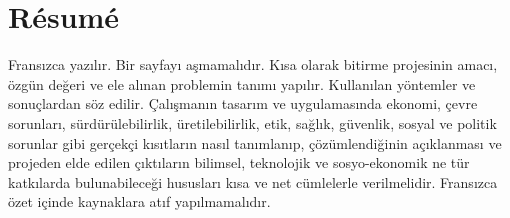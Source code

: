 \chapter{Résumé}

Fransızca yazılır. Bir sayfayı aşmamalıdır. Kısa olarak bitirme projesinin amacı, özgün değeri ve ele alınan problemin tanımı yapılır. Kullanılan yöntemler ve sonuçlardan söz edilir. Çalışmanın tasarım ve uygulamasında ekonomi, çevre sorunları, sürdürülebilirlik, üretilebilirlik, etik, sağlık, güvenlik, sosyal ve politik sorunlar gibi gerçekçi kısıtların nasıl tanımlanıp, çözümlendiğinin açıklanması ve projeden elde edilen çıktıların bilimsel, teknolojik ve sosyo-ekonomik ne tür katkılarda bulunabileceği hususları kısa ve net cümlelerle verilmelidir. Fransızca özet içinde kaynaklara atıf yapılmamalıdır. 

